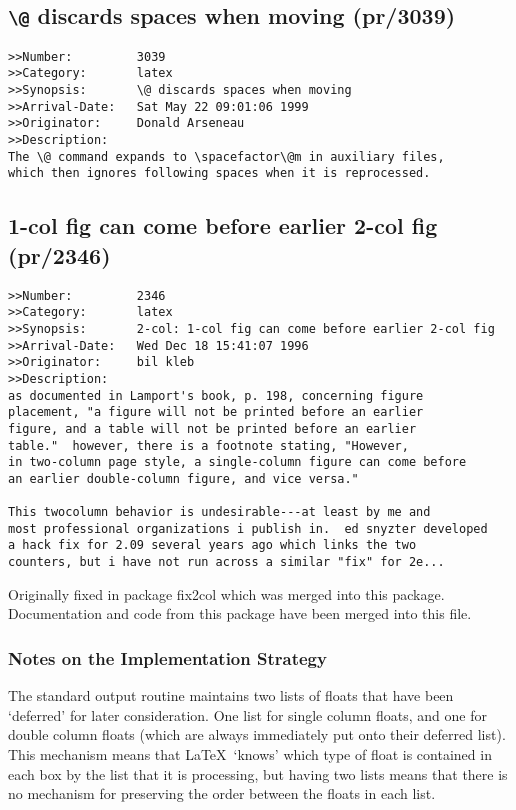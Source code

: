 \documentclass{ltxguide}
\newcommand\Lpack[1]{\mbox{\textsf{#1}}}
\begin{document}
\subsection{\texttt{\textbackslash @} discards spaces when moving
            (pr/3039)}

\begin{verbatim}
>>Number:         3039
>>Category:       latex
>>Synopsis:       \@ discards spaces when moving
>>Arrival-Date:   Sat May 22 09:01:06 1999
>>Originator:     Donald Arseneau
>>Description:
The \@ command expands to \spacefactor\@m in auxiliary files,
which then ignores following spaces when it is reprocessed.
\end{verbatim}

\subsection{1-col fig can come before earlier 2-col fig
           (pr/2346)}

\begin{verbatim}
>>Number:         2346
>>Category:       latex
>>Synopsis:       2-col: 1-col fig can come before earlier 2-col fig
>>Arrival-Date:   Wed Dec 18 15:41:07 1996
>>Originator:     bil kleb
>>Description:
as documented in Lamport's book, p. 198, concerning figure
placement, "a figure will not be printed before an earlier
figure, and a table will not be printed before an earlier
table."  however, there is a footnote stating, "However,
in two-column page style, a single-column figure can come before
an earlier double-column figure, and vice versa."

This twocolumn behavior is undesirable---at least by me and
most professional organizations i publish in.  ed snyzter developed
a hack fix for 2.09 several years ago which links the two
counters, but i have not run across a similar "fix" for 2e...
\end{verbatim}

Originally fixed in package \Lpack{fix2col} which was merged into
this package. Documentation and code from this package have been
merged into this file.

\subsubsection{Notes on the Implementation Strategy}

The standard output routine maintains two lists of floats that have
been `deferred' for later consideration. One list for single column
floats, and one for double column floats (which are always
immediately put onto their deferred list). This mechanism means
that \LaTeX\ `knows' which type of float is contained in each box
by the list that it is processing, but having two lists means
that there is no mechanism for preserving the order between the
floats in each list.
\end{document}
